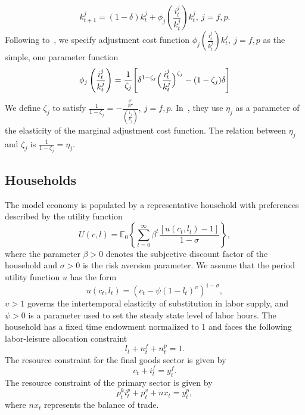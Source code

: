 \documentclass[11pt,a4paper]{article}
\numberwithin{equation}{section}
\theoremstyle{definition}
\begin{document}
\begin{equation}
\label{eq_kr_i}
k^{j}_{t+1}=(1-\delta)k^{j}_{t}+\phi_{j}\left(\frac{i^{j}_{t}}{k^{j}_{t}}\right)k^{j}_{t},~j=f, p.
\end{equation}
Following to~\citet{DECORDOBA200049}, we specify adjustment cost function $\phi_{j}\left(\frac{i^{j}_{t}}{k^{j}_{t}}\right)k^{j}_{t},~j=f, p$ as the simple, one parameter function
\begin{equation}
\phi_{j}\left(\frac{i^{j}_{t}}{k^{j}_{t}}\right)=\frac{1}{\zeta_{j}}\Biggl[\delta^{1-\zeta_{j}}\Bigl(\frac{i^{j}_{t}}{k^{j}_{t}}\Bigr)^{\zeta_{j}}-(1-\zeta_{j})\delta\Biggr]
\end{equation}
We define $\zeta_{j}$ to satisfy $\frac{1}{1-\zeta_{j}}=-\frac{\frac{\phi'}{\phi''}}{(\frac{i_{j}}{k_{j}})},~j=f, p$. In~\citet{KOSE200155}, they use $\eta_{j}$ as a parameter of the elasticity of the marginal adjustment cost function. The relation between $\eta_{j}$ and $\zeta_{j}$ is $\frac{1}{1-\zeta_{j}}=\eta_{j}$.
\subsection{Households}
The model economy is populated by a representative household with preferences described by the utility function
\begin{equation}
U(c, l)=\mathbb{E}_{0}\left\{\sum_{t=0}^{\infty} \beta^{t} \frac{[u(c_{t},l_{t})-1]}{1-\sigma}\right\},
\end{equation}
where the parameter $\beta >0$ denotes the subjective discount factor of the household and $\sigma>0$ is the risk aversion parameter. We assume that the period utility function $u$ has the form
\begin{equation}
u(c_{t},l_{t})=(c_{t}-\psi(1-l_{t})^{\upsilon})^{1-\sigma},
\end{equation}
$\upsilon>1$ governs the intertemporal elasticity of substitution in labor supply, and $\psi >0$ is a parameter used to set the steady state level of labor hours. The household has a fixed time endowment normalized to 1 and faces the following labor-leisure allocation constraint
\begin{equation}
\label{eq_kr_rc_lr}
l_{t}+n^{f}_{t}+n^{p}_{t}=1.
\end{equation}
The resource constraint for the final goods sector is given by
\begin{equation}
\label{eq_kr_rc_f}
c_{t}+i^{f}_{t}=y^{f}_{t}.
\end{equation}
The resource constraint of the primary sector is given by
\begin{equation}
\label{eq_kr_rc_p}
p^{k}_{t}i^{p}_{t}+p^{v}_{t}+nx_{t}=y^{p}_{t},
\end{equation}
where $nx_{t}$ represents the balance of trade.
\end{document}
